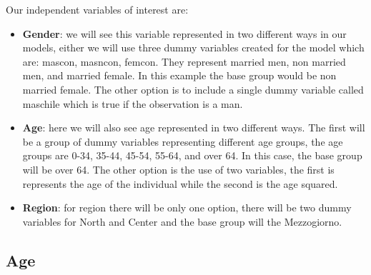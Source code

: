 \documentclass[12pt]{article}
\begin{document}
\begin{spacing}{1.5}
Our independent variables of interest are:

\begin{itemize}
	\item \textbf{Gender}: we will see this variable represented in two different ways in our models, either we will use three dummy variables created for the model which are: mascon, masncon, femcon. They represent married men, non married men, and married female. In this example the base group would be non married female. The other option is to include a single dummy variable called maschile which is true if the observation is a man.
	\item \textbf{Age}: here we will also see age represented in two different ways. The first will be a group of dummy variables representing different age groups, the age groups are 0-34, 35-44, 45-54, 55-64, and over 64. In this case, the base group will be over 64. The other option is the use of two variables, the first is represents the age of the individual while the second is the age squared.
	\item \textbf{Region}: for region there will be only one option, there will be two dummy variables for North and Center and the base group will the Mezzogiorno.
\end{itemize}

\end{spacing}

\subsection{Age}
\end{document}

